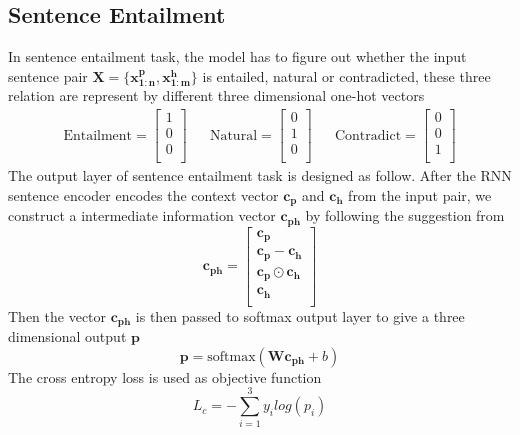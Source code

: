 \subsection{Sentence Entailment}
In sentence entailment task, the model has to figure out whether the input sentence pair $\mathbf{X} = \{\mathbf{x_{1:n}^{p}},\mathbf{x_{1:m}^{h}}\}$ is entailed, natural or contradicted\cite{snli:emnlp2015}, these three relation are represent by different three dimensional one-hot vectors
\begin{align*}
\text{Entailment} = \begin{bmatrix}1 \\0 \\0 \\\end{bmatrix}& &
\text{Natural} = \begin{bmatrix}0 \\1 \\0 \\\end{bmatrix}& &
\text{Contradict} = \begin{bmatrix}0 \\0 \\1 \\\end{bmatrix}
\end{align*}
The output layer of sentence entailment task is designed as follow. After the RNN sentence encoder encodes the context vector $\mathbf{c_{p}}$ and $\mathbf{c_{h}}$ from the input pair, we construct a intermediate information vector $\mathbf{c_{ph}}$ by following the suggestion from\cite{mou2015recognizing}
\begin{equation}
\mathbf{c_{ph}} = \begin{bmatrix}
\mathbf{c_{p}} \\
\mathbf{c_{p}}-\mathbf{c_{h}} \\
\mathbf{c_{p}}\odot \mathbf{c_{h}}\\
\mathbf{c_{h}}\\
\end{bmatrix}
\end{equation}
Then the vector $\mathbf{c_{ph}}$ is then passed to softmax output layer to give a three dimensional output $\mathbf{p}$
\begin{equation}
\mathbf{p} = \text{softmax}(\mathbf{Wc_{ph}} + b)
\end{equation}
The cross entropy loss is used as objective function
\begin{equation}
L_{c} = -\sum_{i=1}^{3}y_{i} log(p_{i})
\end{equation}

